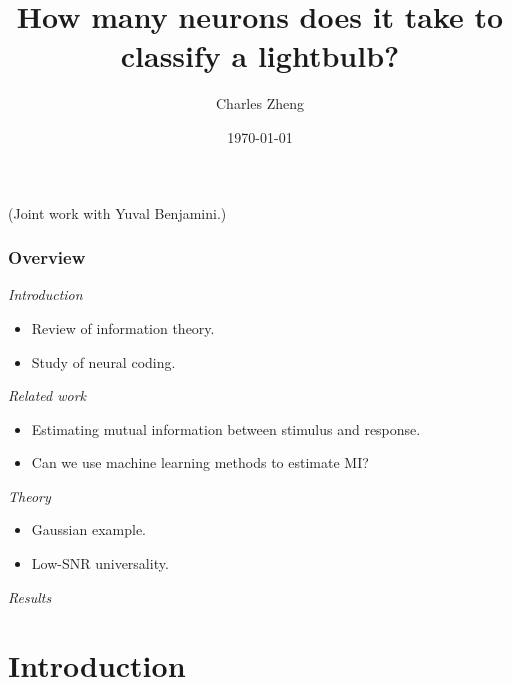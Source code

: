 \documentclass{beamer}
\title[Informal]{How many neurons does it take to classify a lightbulb?}
\author{Charles Zheng} %
\institute[Stanford] %
{Stanford University}
\date{\today} %
\begin{document}
\begin{frame}
\titlepage %
(Joint work with Yuval Benjamini.)
\end{frame}

\begin{frame}
\frametitle{Overview}
\noindent\emph{Introduction}
\begin{itemize}
\item Review of information theory.
\item Study of neural coding.
\end{itemize}
\noindent\emph{Related work}
\begin{itemize}
\item Estimating mutual information between stimulus and response.
\item Can we use machine learning methods to estimate MI?
\end{itemize}
\noindent\emph{Theory}
\begin{itemize}
\item Gaussian example.
\item Low-SNR universality.
\end{itemize}
\noindent\emph{Results}
\end{frame}

\section{Introduction}
\end{document}
